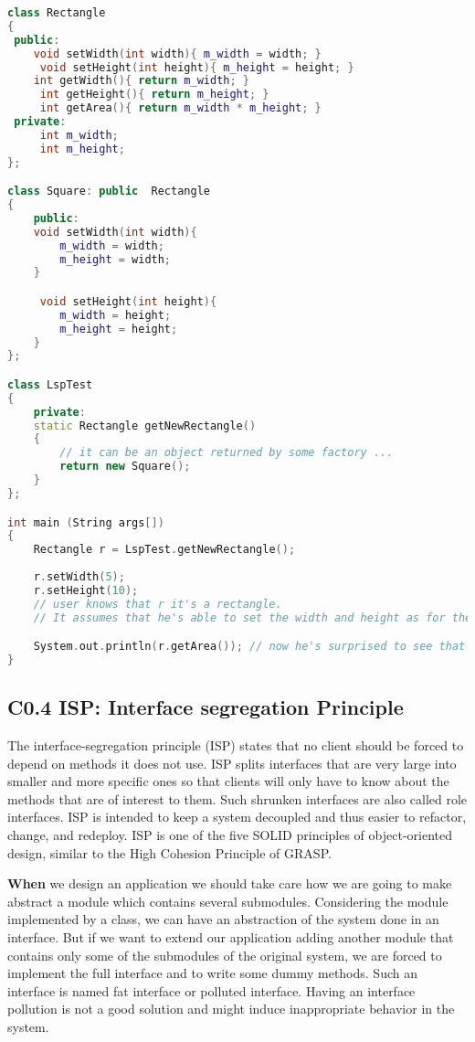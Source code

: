 \documentclass{book}
\begin{document}
\begin{lstlisting}[caption={Violation of Likov's Substitution Principle}, language=C++]
class Rectangle
{
 public:
    void setWidth(int width){ m_width = width; }
	 void setHeight(int height){ m_height = height; }
    int getWidth(){ return m_width; }
	 int getHeight(){ return m_height; } 
	 int getArea(){ return m_width * m_height; }	
 private:
	 int m_width;
	 int m_height;
};

class Square: public  Rectangle 
{
    public:
    void setWidth(int width){
		m_width = width;
		m_height = width;
	}

	 void setHeight(int height){
		m_width = height;
		m_height = height;
	}
};

class LspTest
{
    private:
    static Rectangle getNewRectangle()
	{
		// it can be an object returned by some factory ... 
		return new Square();
	}
};

int main (String args[])
{
	Rectangle r = LspTest.getNewRectangle();
        
	r.setWidth(5);
	r.setHeight(10);
	// user knows that r it's a rectangle. 
	// It assumes that he's able to set the width and height as for the base class

	System.out.println(r.getArea()); // now he's surprised to see that the area is 100 instead of 50.
}
\end{lstlisting}
\subsection{C0.4 ISP: Interface segregation Principle}\label{ISP}
The interface-segregation principle (ISP) states that no client should be forced to depend on methods it does not use.
ISP splits interfaces that are very large into smaller and more specific ones so that clients will only have to know about the methods that are of interest to them.
Such shrunken interfaces are also called role interfaces. ISP is intended to keep a system decoupled and thus easier to refactor, change, and redeploy.
ISP is one of the five SOLID principles of object-oriented design, similar to the High Cohesion Principle of GRASP.

\textbf{When} we design an application we should take care how we are going to make abstract a module which contains several submodules.
Considering the module implemented by a class, we can have an abstraction of the system done in an interface.
But if we want to extend our application adding another module that contains only some of the submodules of the original system,
we are forced to implement the full interface and to write some dummy methods.
Such an interface is named fat interface or polluted interface. Having an interface pollution is not a good solution and might induce inappropriate behavior in the system.
\end{document}
